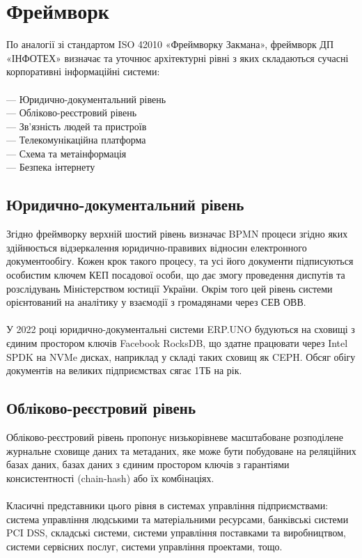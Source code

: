 \chapter{Фреймворк}

По аналогії зі стандартом ISO 42010 «Фреймворку Закмана»,
фреймворк ДП «ІНФОТЕХ» визначає та уточнює архітектурні рівні
з яких складаються сучасні корпоративні інформаційні системи:
\\
\\
--- Юридично-документальний рівень\\
--- Обліково-реєстровий рівень\\
--- Зв'язність людей та пристроїв\\
--- Телекомунікаційна платформа\\
--- Схема та метаінформація\\
--- Безпека інтернету\\

\section{Юридично-документальний рівень}

Згідно фреймворку верхній шостий рівень визначає BPMN процеси згідно яких здійнюється
відзеркалення юридично-правивих відносин електронного документообігу. Кожен крок такого
процесу, та усі його документи підписуються особистим ключем КЕП посадової особи, що дає
змогу проведення диспутів та розслідувань Міністерством юстиції України. Окрім того цей
рівень системи орієнтований на аналітику у взаємодії з громадянами через СЕВ ОВВ.
\\
\\
У 2022 році юридично-документальні системи ERP.UNO будуються на сховищі з єдиним
простором ключів Facebook RocksDB, що здатне працювати через Intel SPDK на NVMe
дисках, наприклад у складі таких сховищ як CEPH. Обсяг обігу документів на великих
підприємствах сягає 1ТБ на рік.

\newpage
\section{Обліково-реєстровий рівень}

Обліково-реєстровий рівень пропонує низькорівневе масштабоване розподілене
журнальне сховище даних та метаданих, яке може бути побудоване на реляційних
базах даних, базах даних з єдиним простором ключів з гарантіями
консистентності (chain-hash) або їх комбінаціях.
\\
\\
Класичні представники цього рівня в системах управління підприємствами: система
управління людськими та матеріальними ресурсами, банківські системи PCI DSS,
складські системи, системи управління поставками та виробництвом, системи сервісних
послуг, системи управління проектами, тощо.

